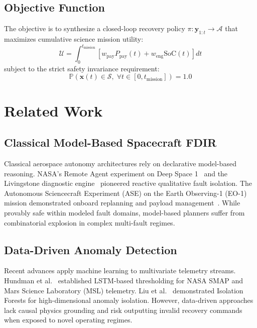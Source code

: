 \documentclass[conference]{IEEEtran}
\begin{document}
\subsection{Objective Function}
The objective is to synthesize a closed-loop recovery policy $\pi: \mathbf{y}_{1:t} \to \mathcal{A}$ that maximizes cumulative science mission utility:
\begin{equation}
\mathcal{U} = \int_{0}^{t_{\text{mission}}} \left[ w_{\text{pay}} P_{\text{pay}}(t) + w_{\text{eng}} \text{SoC}(t) \right] dt
\end{equation}
subject to the strict safety invariance requirement:
\begin{equation}
\mathbb{P}\left(\mathbf{x}(t) \in \mathcal{S}, \;\forall t \in [0, t_{\text{mission}}]\right) = 1.0
\end{equation}

\section{Related Work}

\subsection{Classical Model-Based Spacecraft FDIR}
Classical aerospace autonomy architectures rely on declarative model-based reasoning. NASA's Remote Agent experiment on Deep Space 1~\cite{muscettola1998remote} and the Livingstone diagnostic engine~\cite{williams2003model} pioneered reactive qualitative fault isolation. The Autonomous Sciencecraft Experiment (ASE) on the Earth Observing-1 (EO-1) mission demonstrated onboard replanning and payload management~\cite{chien2005autonomous}. While provably safe within modeled fault domains, model-based planners suffer from combinatorial explosion in complex multi-fault regimes.

\subsection{Data-Driven Anomaly Detection}
Recent advances apply machine learning to multivariate telemetry streams. Hundman et al.~\cite{hundman2018detecting} established LSTM-based thresholding for NASA SMAP and Mars Science Laboratory (MSL) telemetry. Liu et al.~\cite{liu2008isolation} demonstrated Isolation Forests for high-dimensional anomaly isolation. However, data-driven approaches lack causal physics grounding and risk outputting invalid recovery commands when exposed to novel operating regimes.
\end{document}
